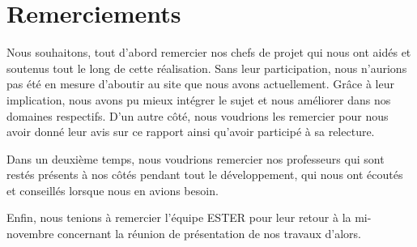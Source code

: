 \chapter*{Remerciements}

Nous souhaitons, tout d'abord remercier nos chefs de projet qui nous ont aidés et soutenus tout le long de cette réalisation. Sans leur participation, nous n'aurions pas été en mesure d'aboutir au site que nous avons actuellement. Grâce à leur implication, nous avons pu mieux intégrer le sujet et nous améliorer dans nos domaines respectifs. 
D'un autre côté, nous voudrions les remercier pour nous avoir donné leur avis sur ce rapport ainsi qu'avoir participé à sa relecture.\

Dans un deuxième temps, nous voudrions remercier nos professeurs qui sont restés présents à nos côtés pendant tout le développement, qui nous ont écoutés et conseillés lorsque nous en avions besoin. \

Enfin, nous tenions à remercier l'équipe ESTER pour leur retour à la mi-novembre concernant la réunion de présentation de nos travaux d'alors. 